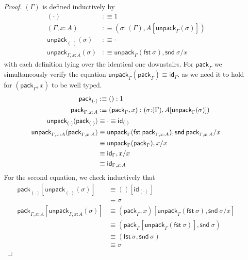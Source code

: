 \documentclass[10pt]{article}
\theoremstyle{definition}
\newcommand\dsd[1]{\ensuremath{\mathsf{#1}}}
\newcommand{\app}[2]{\ensuremath{#1 \: #2}}
\newcommand{\mt}[0]{\ensuremath{()}}
\newcommand{\sigmacl}[3]{\ensuremath{(#1{:}#2,#3)}}
\newcommand{\fst}[1]{\app{\dsd{fst}}{#1}}
\newcommand{\snd}[1]{\app{\dsd{snd}}{#1}}
\newcommand{\id}{\mathsf{id}}
\newcommand\ctxtuple[1]{(#1)}
\newcommand\pack[1]{\ensuremath{\mathsf{pack}_{#1}}}
\newcommand\unpack[2]{\ensuremath{\mathsf{unpack}_{#1}(#2)}}
\begin{document}
\begin{proof}
$\ctxtuple{\Gamma}$ is defined inductively by
\begin{align*}
\ctxtuple{\cdot} &:\equiv 1 \\
\ctxtuple{\Gamma, x : A} &:\equiv \sigmacl{\sigma}{\ctxtuple \Gamma}{A[\unpack{\Gamma}{\sigma}]}\\
\unpack{(\cdot)}{\sigma} &:\equiv \cdot \\
\unpack{\Gamma, x : A}{\sigma} &:\equiv \unpack{\Gamma}{\fst \sigma}, \snd{\sigma}/x
\end{align*}
with each definition lying over the identical one downstairs. 
For $\pack{\Gamma}$ we simultaneously verify the equation $ \unpack{\Gamma}{\pack{\Gamma}} \equiv \id_\Gamma$, as we need it to hold for $(\pack{\Gamma}, x)$ to be well typed.
\begin{align*}
\pack{(\cdot)} &:\equiv \mt : 1 \\
\pack{\Gamma, x : A} &:\equiv (\pack{\Gamma}, x) : \sigmacl{\sigma}{\ctxtuple \Gamma}{A[\unpack{\Gamma}{\sigma}]} \\
\unpack{(\cdot)}{\pack{(\cdot)}} &\equiv  \cdot \equiv \id_{(\cdot)}\\
\unpack{\Gamma, x : A}{\pack{\Gamma, x : A}} 
&\equiv \unpack{\Gamma}{\fst \pack{\Gamma, x : A}}, \snd{\pack{\Gamma, x : A}}/x \\
&\equiv \unpack{\Gamma}{\pack{\Gamma}}, x/x \\
&\equiv \id_\Gamma, x/x \\
&\equiv \id_{\Gamma, x : A}
\end{align*}
For the second equation, we check inductively that
\begin{align*}
\pack{(\cdot)}[\unpack{(\cdot)}{\sigma}] 
&\equiv \mt[\id_{(\cdot)}] \\
&\equiv \sigma \\
\pack{\Gamma, x : A}[\unpack{\Gamma, x : A}{\sigma}]
&\equiv (\pack{\Gamma}, x)[\unpack{\Gamma}{\fst \sigma}, \snd{\sigma}/x] \\
&\equiv (\pack{\Gamma}[\unpack{\Gamma}{\fst \sigma}], \snd \sigma) \\
&\equiv (\fst \sigma, \snd \sigma) \\
&\equiv \sigma
\end{align*}
\end{proof}
\end{document}
